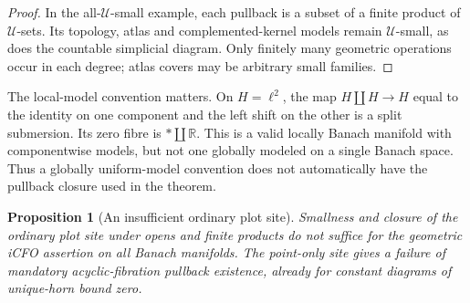 \documentclass[12pt]{amsart}
\newtheorem{prop}[thm]{Proposition}
\theoremstyle{definition}
\theoremstyle{remark}
\numberwithin{equation}{section}
\newcommand{\R}{\mathbb R}
\begin{document}
\begin{proof}
In the all-$\mathcal U$-small example, each pullback is
a subset of a finite product of $\mathcal U$-sets.
Its topology, atlas and complemented-kernel models remain
$\mathcal U$-small, as does the countable simplicial
diagram. Only finitely many geometric operations occur
in each degree; atlas covers may be arbitrary small families.
\end{proof}

The local-model convention matters. On $H=\ell^2$, the map
$H\amalg H\to H$ equal to the identity on one component
and the left shift on the other is a split submersion.
Its zero fibre is $*\amalg\R$. This is a valid locally
Banach manifold with componentwise models, but not one
globally modeled on a single Banach space. Thus a
globally uniform-model convention does not automatically
have the pullback closure used in the theorem.

\begin{prop}[An insufficient ordinary plot site]
\label{prop:ordinary-insufficient-site}
Smallness and closure of the ordinary plot site under
opens and finite products do not suffice for the
geometric iCFO assertion on all Banach manifolds.
The point-only site gives a failure of mandatory
acyclic-fibration pullback existence, already for
constant diagrams of unique-horn bound zero.
\end{prop}
\end{document}
